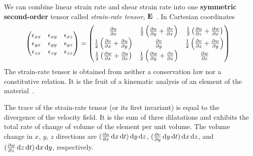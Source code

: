 We can combine linear strain rate and shear strain rate into one \textbf{symmetric second-order} tensor called \emph{strain-rate tensor}, \(\mathbf{E}\)~\cite{courseUniGeBottaro}.
In Cartesian coordinates
%
\begin{equation}
  \begin{pmatrix}
    \epsilon_{xx} & \epsilon_{xy} & \epsilon_{xz} \\
    \epsilon_{yx} & \epsilon_{yy} & \epsilon_{yz} \\
    \epsilon_{zx} & \epsilon_{zy} & \epsilon_{zz}
  \end{pmatrix}
  =
  \begin{pmatrix}
    \ddx{u} & \f{1}{2}\left(\ddy{u} + \ddx{v}\right) & \f{1}{2}\left(\ddz{u} + \ddx{w}\right) \\
    \f{1}{2} \left(\ddx{v} + \ddy{u}\right) & \ddy{v} & \f{1}{2} \left(\ddz{v} + \ddy{w}\right) \\
    \f{1}{2} \left(\ddx{w} + \ddz{u}\right) & \f{1}{2}\left(\ddy{w} + \ddz{v}\right) & \ddz{w}
  \end{pmatrix}
  \label{eq:strain-rate-tensor}
\end{equation}
%
The strain-rate tensor is obtained from neither a conservation law nor a constitutive relation.
It is the fruit of a kinematic analysis of an element of the material~\cite{ghazanfarian2024applied}.

The trace of the strain-rate tensor (or its first invariant) is equal to the divergence of the velocity field.
It is the sum of three dilatations and exhibits the total rate of change of volume of the element per unit volume.
The volume change in \(x\), \(y\), \(z\) directions are \((\frac{\partial u}{\partial x}\mathop{}\!\mathrm{d} x \mathop{}\!\mathrm{d} t) \mathop{}\!\mathrm{d} y \mathop{}\!\mathrm{d} z\), \((\frac{\partial v}{\partial y}\mathop{}\!\mathrm{d} y \mathop{}\!\mathrm{d} t) \mathop{}\!\mathrm{d} x \mathop{}\!\mathrm{d} z\), and \((\frac{\partial w}{\partial z}\mathop{}\!\mathrm{d} z \mathop{}\!\mathrm{d} t) \mathop{}\!\mathrm{d} x \mathop{}\!\mathrm{d} y\), respectively.
